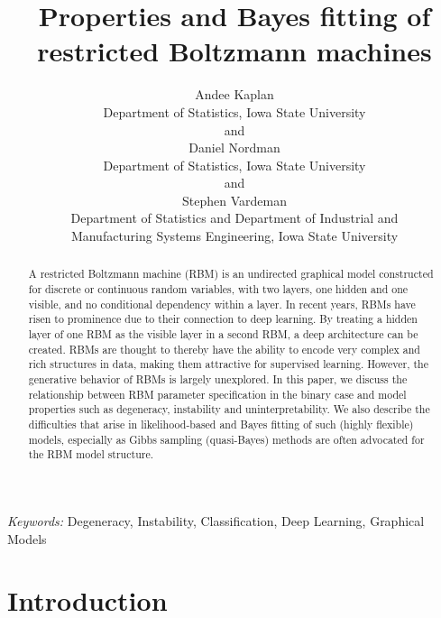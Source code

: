 \documentclass[12pt]{article}
\theoremstyle{definition}
\begin{document}
\def\spacingset#1{\renewcommand{\baselinestretch}%
{#1}\small\normalsize} \spacingset{1}

\title{\bf Properties and Bayes fitting of restricted Boltzmann machines}
\author{Andee Kaplan \\ Department of Statistics, Iowa State University \\  and \\ Daniel Nordman \\ Department of Statistics, Iowa State University \\  and \\ Stephen Vardeman \\ Department of Statistics and Department of Industrial and\\
Manufacturing Systems Engineering, Iowa State University \\ }

\date{}
\maketitle
\begin{abstract}
A restricted Boltzmann machine (RBM) is an undirected graphical model
constructed for discrete or continuous random variables, with two
layers, one hidden and one visible, and no conditional dependency within
a layer. In recent years, RBMs have risen to prominence due to their
connection to deep learning. By treating a hidden layer of one RBM as
the visible layer in a second RBM, a deep architecture can be created.
RBMs are thought to thereby have the ability to encode very complex and
rich structures in data, making them attractive for supervised learning.
However, the generative behavior of RBMs is largely unexplored. In this
paper, we discuss the relationship between RBM parameter specification
in the binary case and model properties such as degeneracy, instability
and uninterpretability. We also describe the difficulties that arise in
likelihood-based and Bayes fitting of such (highly flexible) models,
especially as Gibbs sampling (quasi-Bayes) methods are often advocated
for the RBM model structure.
\end{abstract}
\noindent%
{\it Keywords:}  Degeneracy, Instability, Classification, Deep Learning, Graphical Models
\vfill

\newpage
\spacingset{1.45}


\section{Introduction}\label{introduction}
\end{document}

